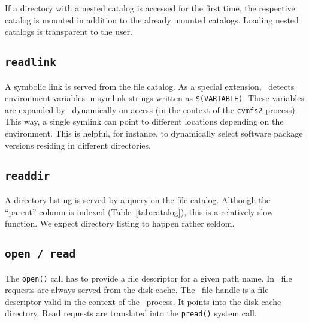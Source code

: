 If a directory with a nested catalog is accessed for the first time, the respective catalog is mounted in addition to the already mounted catalogs.
Loading nested catalogs is transparent to the user.

\subsection{\tt readlink}
A symbolic link is served from the file catalog.
As a special extension, \cvmfs\ detects environment variables in symlink strings written as \texttt{\$(VARIABLE)}.
These variables are expanded by \cvmfs\ dynamically on access (in the context of the \texttt{cvmfs2} process).
This way, a single symlink can point to different locations depending on the environment.
This is helpful, for instance, to dynamically select software package versions residing in different directories.

\subsection{\tt readdir}
A directory listing is served by a query on the file catalog.
Although the ``parent''-column is indexed (\cf Table~\ref{tab:catalog}), this is a relatively slow function.
We expect directory listing to happen rather seldom.

\subsection{\tt open / read}
The \texttt{open()} call has to provide a file descriptor for a given path name.
In \cvmfs\ file requests are always served from the disk cache.
The \fuse\ file handle is a file descriptor valid in the context of the \cvmfs\ process.
It points into the disk cache directory.
Read requests are translated into the \texttt{pread()} system call.

